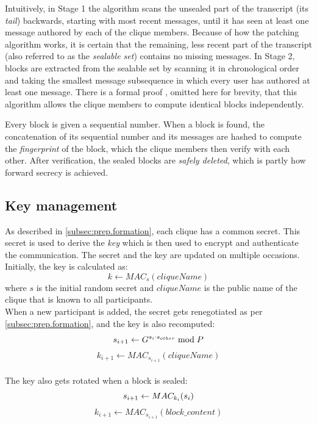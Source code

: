 \documentclass[a4paper, twoside, 12pt]{report}
\begin{document}
Intuitively, in Stage 1 the algorithm scans the unsealed part of the transcript (its \emph{tail}) backwards, starting with most recent messages, until it has seen at least one message authored by each of the clique members. Because of how the patching algorithm works, it is certain that the remaining, less recent part of the transcript (also referred to as the \emph{sealable set}) contains no missing messages. In Stage 2, blocks are extracted from the sealable set by scanning it in chronological order and taking the smallest message subsequence in which every user has authored at least one message. There is a formal proof \cite{reardon2007kleeq}, omitted here for brevity, that this algorithm allows the clique members to compute identical blocks independently.

Every block is given a sequential number. When a block is found, the concatenation of its sequential number and its messages are hashed to compute the \emph{fingerprint} of the block, which the clique members then verify with each other. After verification, the sealed blocks are \emph{safely deleted}, which is partly how forward secrecy is achieved.


\subsection{Key management}
\label{subsec:prep.keyman}
As described in \cref{subsec:prep.formation}, each clique has a common secret. This secret is used to derive the \emph{key} which is then used to encrypt and authenticate the communication. The secret and the key are updated on multiple occasions. Initially, the key is calculated as:
\begin{equation*}
    k \leftarrow MAC_{s}(cliqueName)
\end{equation*}
where $s$ is the initial random secret and $cliqueName$ is the public name of the clique that is known to all participants. \\ 

When a new participant is added, the secret gets renegotiated as per \cref{subsec:prep.formation}, and the key is also recomputed: \\
\[
    s_{i+1} \leftarrow G^{s_i \cdot s_{other}} \bmod P  \\ 
\]
\[
    k_{i+1} \leftarrow MAC_{s_{i+1}}(cliqueName)
\] \\


The key also gets rotated when a block is sealed:
\[
    s_{i+1} \leftarrow MAC_{k_i}(s_i) \\ 
\]
\[
    k_{i+1} \leftarrow MAC_{s_{i+1}}(block\_content)
\] \\
\end{document}

